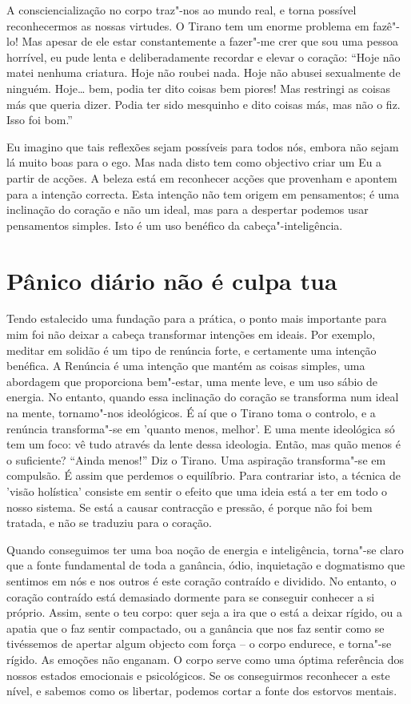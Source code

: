 \enlargethispage*{\baselineskip}

A consciencialização no corpo traz"-nos ao mundo real, e torna possível
reconhecermos as nossas virtudes. O Tirano tem um enorme problema em
fazê"-lo! Mas apesar de ele estar constantemente a fazer"-me crer que sou
uma pessoa horrível, eu pude lenta e deliberadamente recordar e elevar o
coração: “Hoje não matei nenhuma criatura. Hoje não roubei nada. Hoje
não abusei sexualmente de ninguém. Hoje\ldots{} bem, podia ter dito coisas
bem piores! Mas restringi as coisas más que queria dizer. Podia ter sido
mesquinho e dito coisas más, mas não o fiz. Isso foi bom.”

Eu imagino que tais reflexões sejam possíveis para todos nós, embora não
sejam lá muito boas para o ego. Mas nada disto tem como objectivo criar
um Eu a partir de acções. A beleza está em reconhecer acções que
provenham e apontem para a intenção correcta. Esta intenção não tem
origem em pensamentos; é uma inclinação do coração e não um ideal, mas
para a despertar podemos usar pensamentos simples. Isto é um uso
benéfico da cabeça"-inteligência.

\section{Pânico diário não é culpa tua}

Tendo estalecido uma fundação para a prática, o ponto mais importante
para mim foi não deixar a cabeça transformar intenções em ideais. Por
exemplo, meditar em solidão é um tipo de renúncia forte, e certamente
uma intenção benéfica. A Renúncia é uma intenção que mantém as coisas
simples, uma abordagem que proporciona bem"-estar, uma mente leve, e um
uso sábio de energia. No entanto, quando essa inclinação do coração se
transforma num ideal na mente, tornamo"-nos ideológicos. É aí que o
Tirano toma o controlo, e a renúncia transforma"-se em 'quanto menos,
melhor'. E uma mente ideológica só tem um foco: vê tudo através da lente
dessa ideologia. Então, mas quão menos é o suficiente? “Ainda menos!”
Diz o Tirano. Uma aspiração transforma"-se em compulsão. É assim que
perdemos o equilíbrio. Para contrariar isto, a técnica de 'visão
holística' consiste em sentir o efeito que uma ideia está a ter em todo
o nosso sistema. Se está a causar contracção e pressão, é porque não foi
bem tratada, e não se traduziu para o coração.

Quando conseguimos ter uma boa noção de energia e inteligência, torna"-se
claro que a fonte fundamental de toda a ganância, ódio, inquietação e
dogmatismo que sentimos em nós e nos outros é este coração contraído e
dividido. No entanto, o coração contraído está demasiado dormente para
se conseguir conhecer a si próprio. Assim, sente o teu corpo: quer seja
a ira que o está a deixar rígido, ou a apatia que o faz sentir
compactado, ou a ganância que nos faz sentir como se tivéssemos de
apertar algum objecto com força -- o corpo endurece, e torna"-se rígido.
As emoções não enganam. O corpo serve como uma óptima referência dos
nossos estados emocionais e psicológicos. Se os conseguirmos reconhecer
a este nível, e sabemos como os libertar, podemos cortar a fonte dos
estorvos mentais.

